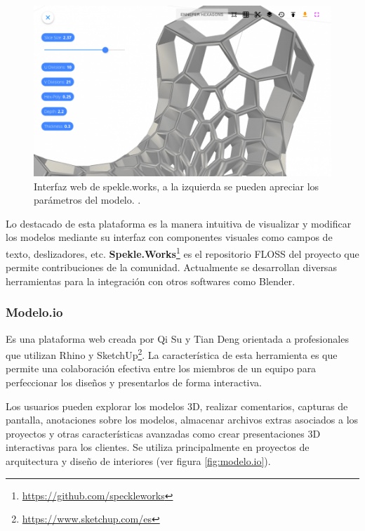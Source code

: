 \begin{figure}[h]
\includegraphics[width=14cm]{Img/Desarrollo/spekle-plugin2.png}
\centering
\caption{\footnotesize{Interfaz web de spekle.works, a la izquierda se pueden apreciar los parámetros del modelo. \citep{Dimitrie2017}.}}
\label{fig:spekle}
\end{figure}

Lo destacado de esta plataforma es la manera intuitiva de visualizar y modificar los modelos mediante su interfaz con componentes visuales como campos de texto, deslizadores, etc. \textbf{Spekle.Works}\footnote{\url{https://github.com/speckleworks}} es el repositorio FLOSS del proyecto que permite contribuciones de la comunidad. Actualmente se desarrollan diversas herramientas para la integración con otros softwares como Blender. 


\subsubsection{Modelo.io}
 Es una plataforma web creada por Qi Su y Tian Deng  \citep{Modelo.io2018} orientada a profesionales que utilizan Rhino y SketchUp\footnote{\url{https://www.sketchup.com/es}}. La característica de esta herramienta es que permite una colaboración efectiva entre los miembros de un equipo para perfeccionar los diseños y presentarlos de forma interactiva.

Los usuarios pueden explorar los modelos 3D, realizar comentarios, capturas de pantalla, anotaciones sobre los modelos, almacenar archivos extras asociados a los proyectos y otras características avanzadas como crear presentaciones 3D interactivas para los clientes. 
Se utiliza principalmente en   proyectos de arquitectura y diseño de interiores (ver figura \ref{fig:modelo.io}). 


